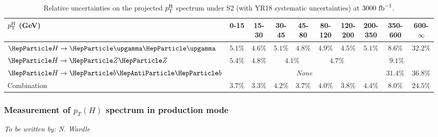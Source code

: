 \begin{table}[htb]
\footnotesize
\begin{center}
\begin{tabular}{l|c|c|c|c|c|c|c|c|c}
$p_\text{T}^\text{H}$ (GeV)       & 0-15    &  15-30   &  30-45    &  45-80   &  80-120  &  120-200  &  200-350  &  350-600  &  600-$\infty$  \\
\hline
$\hgg$       & $5.1\%$ & $4.6\%$ & $5.1\%$ & $4.8\%$            & $4.9\%$ & $4.5\%$            & $5.1\%$ & $8.6\%$  & $32.2\%$ \\ 
$\hzz$       & $5.4\%$ & $4.8\%$ & \multicolumn{2}{c|}{$4.1\%$} & \multicolumn{2}{c|}{$4.7\%$} & \multicolumn{3}{c}{$9.1\%$} \\ 
$\hbb$       & \multicolumn{7}{c|}{\textit{None}}                                              & $31.4\%$ & $36.8\%$ \\ 
Combination  & $3.7\%$ & $3.3\%$ & $4.2\%$ & $3.7\%$            & $4.0\%$ & $3.8\%$            & $4.4\%$ & $8.0\%$  & $24.5\%$ \\
\end{tabular}
\end{center}
\caption{
    Relative uncertainties on the projected $p_\text{T}^\text{H}$ spectrum under S2 (with YR18 systematic uncertainties) at $3000~\text{fb}^{-1}$.
    }
\label{tab:proj_pth_unc_scen2}
\end{table}



\subsubsection{Measurement of $p_{T}(H)$ spectrum  in \ttH production mode}
\begin{center}{\it To be written by: N. Wardle} \end{center}
